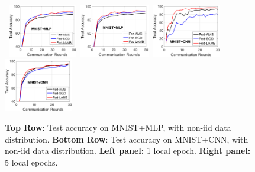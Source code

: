 \documentclass[11pt]{article}
\begin{document}
\vspace{-0.1in}
\begin{figure}[t]
    \begin{center}
        \mbox{\hspace{-0.1in}
        \includegraphics[width=0.27\textwidth]{figure/mnist_testerror_mlp_ep1_client50_iid0.eps}\hspace{-0.1in}
        \includegraphics[width=0.27\textwidth]{figure/mnist_testerror_mlp_ep5_client50_iid0.eps}\hspace{-0.1in}
        \includegraphics[width=0.27\textwidth]{figure/mnist_testerror_cnn_ep1_client60_iid0.eps}\hspace{-0.1in}
        \includegraphics[width=0.27\textwidth]{figure/mnist_testerror_cnn_ep5_client50_iid0.eps}
        }
    \end{center}
	\caption{\textbf{Top Row}: Test accuracy on MNIST+MLP, with non-iid data distribution. \textbf{Bottom Row}: Test accuracy on MNIST+CNN, with non-iid data distribution. \textbf{Left panel:} 1 local epoch. \textbf{Right panel:} 5 local epochs.}
	\label{fig:mnist-mlp-noniid}
\end{figure}
\end{document}

